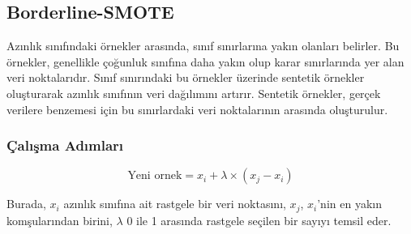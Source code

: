 \newpage

\subsection{Borderline-SMOTE}
Azınlık sınıfındaki örnekler arasında, sınıf sınırlarına yakın olanları belirler. Bu örnekler, genellikle çoğunluk sınıfına daha yakın olup karar sınırlarında yer alan veri noktalarıdır. Sınıf sınırındaki bu örnekler üzerinde sentetik örnekler oluşturarak azınlık sınıfının veri dağılımını artırır. Sentetik örnekler, gerçek verilere benzemesi için bu sınırlardaki veri noktalarının arasında oluşturulur.

\subsubsection{Çalışma Adımları}

\[ \text{Yeni ornek} = x_i + \lambda \times (x_j - x_i) \]

Burada, $x_i$ azınlık sınıfına ait rastgele bir veri noktasını, $x_j$, $x_i$'nin en yakın komşularından birini, $\lambda$ 0 ile 1 arasında rastgele seçilen bir sayıyı temsil eder.

